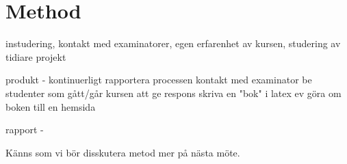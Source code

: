 \section{Method}
instudering, kontakt med examinatorer, egen erfarenhet av kursen, studering av tidiare projekt


produkt - 
kontinuerligt rapportera processen
kontakt med examinator
be studenter som gått/går kursen att ge respons
skriva en "bok" i latex
ev göra om boken till en hemsida

rapport - 


Känns som vi bör disskutera metod mer på nästa möte.

\iffalse
Metod/Genomförande
Hur gruppen tänkt sig att genomföra arbetet Olika deluppgifter/delstudier kräver ofta separata metodavsnitt.

Metodbeskrivningen förankras vanligen i metodlitteratur. 

Detta är typiskt ett avsnitt som uppdateras under arbetets gång
\fi